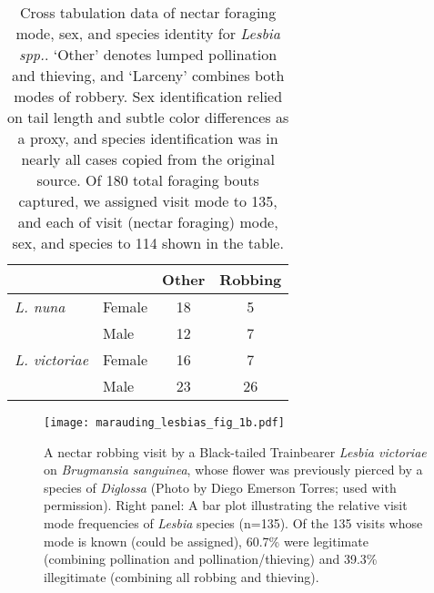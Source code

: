 \documentclass[fleqn,10pt,lineno]{wlpeerj}
\begin{document}



\clearpage

\begin{table}[ht]
\caption{\label{tab:widgets} Cross tabulation data of nectar foraging mode, sex, and species identity for \textit{Lesbia spp.}. `Other' denotes lumped pollination and thieving, and `Larceny' combines both modes of robbery. Sex identification relied on tail length and subtle color differences as a proxy, and species identification was in nearly all cases copied from the original source. Of 180 total foraging bouts captured, we assigned visit mode to 135, and each of visit (nectar foraging) mode, sex, and species to 114 shown in the table.}
\centering
\begin{tabular}{@{\vrule height 8pt depth 4pt width 0pt}llcc}
           			& 		& Other 	& Robbing \\ \hline
    {\em L. nuna} 	& Female 	& 18 	& 5 \\
    				& Male 	& 12 	& 7 \\ \hline
   {\em L. victoriae} 	& Female 	& 16 	& 7 \\
    				& Male 	& 23	& 26 \\ \hline
\end{tabular}
\end{table}
\clearpage




\begin{figure}[ht]
\centering
\texttt{[image: marauding\_lesbias\_fig\_1b.pdf]}
\caption{A nectar robbing visit by a Black-tailed Trainbearer \textit{Lesbia victoriae} on \textit{Brugmansia sanguinea}, whose flower was previously pierced by a species of \textit{Diglossa} (Photo by Diego Emerson Torres; used with permission). Right panel: A bar plot illustrating the relative visit mode frequencies of \textit{Lesbia} species (n=135). Of the 135 visits whose mode is known (could be assigned), 60.7\% were legitimate (combining pollination and pollination/thieving) and 39.3\% illegitimate (combining all robbing and thieving).}
\label{fig:fig1}
\end{figure}
\end{document}
